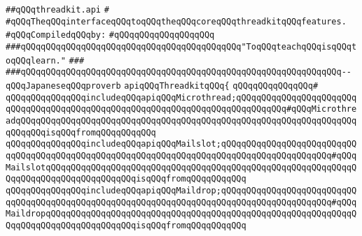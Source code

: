 \label{src/lib/src/lib/thread-kit/src/core-thread-kit/threadkit.api}
\verb|##qQQqthreadkit.api|\newline
\verb|#|\newline
\verb|#qQQqTheqQQqinterfaceqQQqtoqQQqtheqQQqcoreqQQqthreadkitqQQqfeatures.|\newline
\newline
\verb|#qQQqCompiledqQQqby:|\newline
\verb|#qQQqqQQqqQQqqQQqqQQq|\newline
\newline
\newline
\newline
\newline
\newline
\newline
\verb|###qQQqqQQqqQQqqQQqqQQqqQQqqQQqqQQqqQQqqQQqqQQq"ToqQQqteachqQQqisqQQqtoqQQqlearn."|\newline
\verb|###|\newline
\verb|###qQQqqQQqqQQqqQQqqQQqqQQqqQQqqQQqqQQqqQQqqQQqqQQqqQQqqQQqqQQqqQQq--qQQqJapaneseqQQqproverb|\newline
\newline
\newline
\newline
\verb|apiqQQqThreadkitqQQq{|\newline
\verb|qQQqqQQqqQQqqQQq#|\newline
\verb|qQQqqQQqqQQqqQQqincludeqQQqapiqQQqMicrothread;qQQqqQQqqQQqqQQqqQQqqQQqqQQqqQQqqQQqqQQqqQQqqQQqqQQqqQQqqQQqqQQqqQQqqQQqqQQqqQQq#qQQqMicrothreadqQQqqQQqqQQqqQQqqQQqqQQqqQQqqQQqqQQqqQQqqQQqqQQqqQQqqQQqqQQqqQQqqQQqqQQqqQQqisqQQqfromqQQqqQQqqQQq|\newline
\verb|qQQqqQQqqQQqqQQqincludeqQQqapiqQQqMailslot;qQQqqQQqqQQqqQQqqQQqqQQqqQQqqQQqqQQqqQQqqQQqqQQqqQQqqQQqqQQqqQQqqQQqqQQqqQQqqQQqqQQqqQQqqQQq#qQQqMailslotqQQqqQQqqQQqqQQqqQQqqQQqqQQqqQQqqQQqqQQqqQQqqQQqqQQqqQQqqQQqqQQqqQQqqQQqqQQqqQQqqQQqqQQqisqQQqfromqQQqqQQqqQQq|\newline
\verb|qQQqqQQqqQQqqQQqincludeqQQqapiqQQqMaildrop;qQQqqQQqqQQqqQQqqQQqqQQqqQQqqQQqqQQqqQQqqQQqqQQqqQQqqQQqqQQqqQQqqQQqqQQqqQQqqQQqqQQqqQQqqQQq#qQQqMaildropqQQqqQQqqQQqqQQqqQQqqQQqqQQqqQQqqQQqqQQqqQQqqQQqqQQqqQQqqQQqqQQqqQQqqQQqqQQqqQQqqQQqqQQqisqQQqfromqQQqqQQqqQQq|\newline
